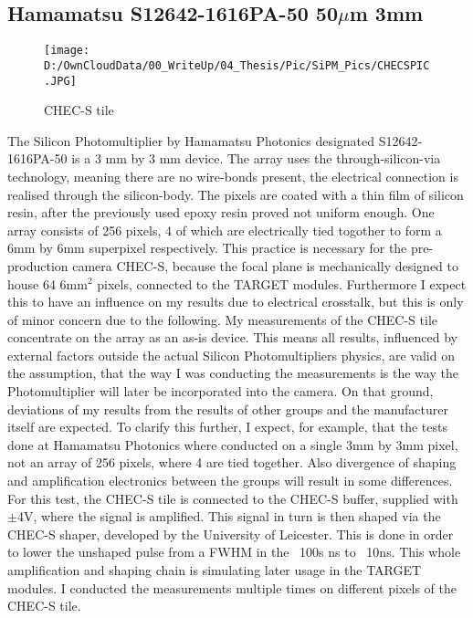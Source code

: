 \documentclass[12pt,article,type=msc,colorback,accentcolor=tud9c]{tudthesis}
\begin{document}
\subsection{Hamamatsu S12642-1616PA-50 50$\mu$m 3mm}
\begin{wrapfigure}{R}{0.3\textwidth}
\centering
\texttt{[image: D:/OwnCloudData/00\_WriteUp/04\_Thesis/Pic/SiPM\_Pics/CHECSPIC.JPG]}
\caption{\label{fig:CHECSTILE}CHEC-S tile}
\end{wrapfigure}
The Silicon Photomultiplier by Hamamatsu Photonics designated S12642-1616PA-50 is a 3 mm by 3 mm device. The array uses the through-silicon-via technology, meaning there are no wire-bonds present, the electrical connection is realised through the silicon-body. The pixels are coated with a thin film of silicon resin, after the previously used epoxy resin proved not uniform enough. One array consists of 256 pixels, 4 of which are electrically tied togother to form a 6mm by 6mm superpixel respectively. This practice is necessary for the pre-production camera CHEC-S, because the focal plane is mechanically designed to house 64 6mm$^{2}$ pixels, connected to the TARGET modules. Furthermore I expect this to have an influence on my results due to electrical crosstalk, but this is only of minor concern due to the following. My measurements of the CHEC-S tile concentrate on the array as an as-is device. This means all results, influenced by external factors outside the actual Silicon Photomultipliers physics, are valid on the assumption, that the way I was conducting the measurements is the way the Photomultiplier will later be incorporated into the camera. On that ground, deviations of my results from the results of other groups and the manufacturer itself are expected. To clarify this further, I expect, for example, that the tests done at Hamamatsu Photonics where conducted on a single 3mm by 3mm pixel, not an array of 256 pixels, where 4 are tied together. Also divergence of shaping and amplification electronics between the groups will result in some differences. For this test, the CHEC-S tile is connected to the CHEC-S buffer, supplied with $\pm$4V, where the signal is amplified. This signal in turn is then shaped via the CHEC-S shaper, developed by the University of Leicester. This is done in order to lower the unshaped pulse from a FWHM in the ~100s ns to ~10ns. This whole amplification and shaping chain is simulating later usage in the TARGET modules. I conducted the measurements multiple times on different pixels of the CHEC-S tile.
\end{document}
